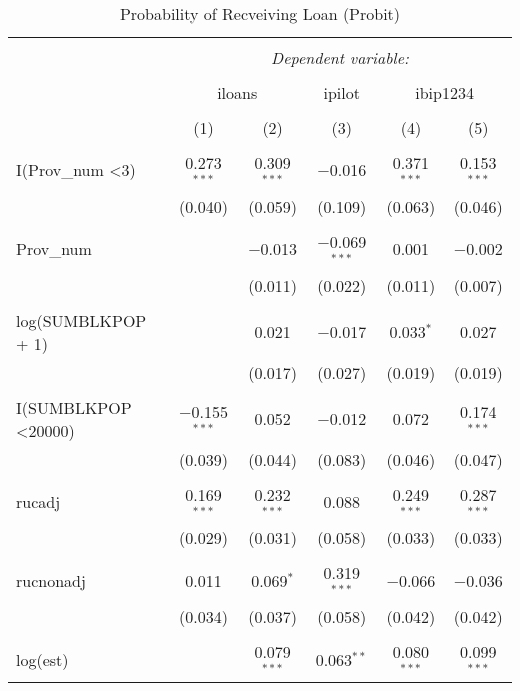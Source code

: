 
\begin{table}[!htbp] \centering 
  \caption{Probability of Recveiving Loan (Probit)} 
  \label{} 
\begin{tabular}{@{\extracolsep{5pt}}lccccc} 
\\[-1.8ex]\hline 
\hline \\[-1.8ex] 
 & \multicolumn{5}{c}{\textit{Dependent variable:}} \\ 
\cline{2-6} 
\\[-1.8ex] & \multicolumn{2}{c}{iloans} & ipilot & \multicolumn{2}{c}{ibip1234} \\ 
\\[-1.8ex] & (1) & (2) & (3) & (4) & (5)\\ 
\hline \\[-1.8ex] 
 I(Prov\_num \textless  3) & 0.273$^{***}$ & 0.309$^{***}$ & $-$0.016 & 0.371$^{***}$ & 0.153$^{***}$ \\ 
  & (0.040) & (0.059) & (0.109) & (0.063) & (0.046) \\ 
  & & & & & \\ 
 Prov\_num &  & $-$0.013 & $-$0.069$^{***}$ & 0.001 & $-$0.002 \\ 
  &  & (0.011) & (0.022) & (0.011) & (0.007) \\ 
  & & & & & \\ 
 log(SUMBLKPOP + 1) &  & 0.021 & $-$0.017 & 0.033$^{*}$ & 0.027 \\ 
  &  & (0.017) & (0.027) & (0.019) & (0.019) \\ 
  & & & & & \\ 
 I(SUMBLKPOP \textless  20000) & $-$0.155$^{***}$ & 0.052 & $-$0.012 & 0.072 & 0.174$^{***}$ \\ 
  & (0.039) & (0.044) & (0.083) & (0.046) & (0.047) \\ 
  & & & & & \\ 
 rucadj & 0.169$^{***}$ & 0.232$^{***}$ & 0.088 & 0.249$^{***}$ & 0.287$^{***}$ \\ 
  & (0.029) & (0.031) & (0.058) & (0.033) & (0.033) \\ 
  & & & & & \\ 
 rucnonadj & 0.011 & 0.069$^{*}$ & 0.319$^{***}$ & $-$0.066 & $-$0.036 \\ 
  & (0.034) & (0.037) & (0.058) & (0.042) & (0.042) \\ 
  & & & & & \\ 
 log(est) &  & 0.079$^{***}$ & 0.063$^{**}$ & 0.080$^{***}$ & 0.099$^{***}$ \\ 

\end{tabular}
\end{table}
